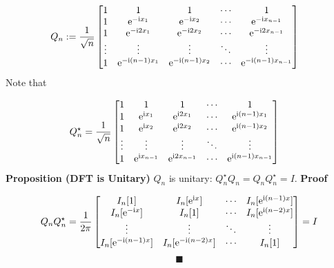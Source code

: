 \documentclass[12pt,landscape]{article}
\begin{document}
{\begin{align*}
Q_n &:= {1 \over \sqrt{n}} \begin{bmatrix} 1 & 1 & 1&  \ensuremath{\cdots} & 1 \\
                                    1 & {\rm e}^{-{\rm i} x_1} & {\rm e}^{-{\rm i} x_2} & \ensuremath{\cdots} & {\rm e}^{-{\rm i} x_{n-1}} \\
                                    1 & {\rm e}^{-{\rm i} 2 x_1} & {\rm e}^{-{\rm i} 2 x_2} & \ensuremath{\cdots} & {\rm e}^{-{\rm i} 2x_{n-1}} \\
                                    \ensuremath{\vdots} & \ensuremath{\vdots} & \ensuremath{\vdots} & \ensuremath{\ddots} & \ensuremath{\vdots} \\
                                    1 & {\rm e}^{-{\rm i} (n-1) x_1} & {\rm e}^{-{\rm i} (n-1) x_2} & \ensuremath{\cdots} & {\rm e}^{-{\rm i} (n-1) x_{n-1}}
\end{bmatrix} 
\end{align*}
Note that


\begin{align*}
Q_n^\ensuremath{\star} &= {1 \over \sqrt{n}} \begin{bmatrix}
1 & 1 & 1&  \ensuremath{\cdots} & 1 \\
1 & {\rm e}^{{\rm i} x_1} & {\rm e}^{{\rm i} 2 x_1} & \ensuremath{\cdots} & {\rm e}^{{\rm i} (n-1) x_1} \\
1 &  {\rm e}^{{\rm i} x_2}  & {\rm e}^{{\rm i} 2 x_2} & \ensuremath{\cdots} & {\rm e}^{{\rm i} (n-1)x_2} \\
\ensuremath{\vdots} & \ensuremath{\vdots} & \ensuremath{\vdots} & \ensuremath{\ddots} & \ensuremath{\vdots} \\
1 & {\rm e}^{{\rm i} x_{n-1}} & {\rm e}^{{\rm i} 2 x_{n-1}} & \ensuremath{\cdots} & {\rm e}^{{\rm i} (n-1) x_{n-1}}
\end{bmatrix} 
\end{align*}
\textbf{Proposition (DFT is Unitary)} $Q_n$ is unitary: $Q_n^\ensuremath{\star} Q_n = Q_n Q_n^\ensuremath{\star} = I$.
\newpage
\textbf{Proof}

\[
Q_n Q_n^\ensuremath{\star}  = \frac{1}{2\pi}\begin{bmatrix} I_n[1] & I_n[{\rm e}^{{\rm i} x}] & \ensuremath{\cdots} & I_n[{\rm e}^{{\rm i} (n-1) x}] \\
                            I_n[{\rm e}^{-{\rm i} x}] & I_n[1] & \ensuremath{\cdots} & I_n[{\rm e}^{{\rm i} (n-2) x}] \\
                            \ensuremath{\vdots} & \ensuremath{\vdots} & \ensuremath{\ddots} & \ensuremath{\vdots} \\
                            I_n[{\rm e}^{-{\rm i}(n-1) x}] & I_n[{\rm e}^{-{\rm i}(n-2) x}] & \ensuremath{\cdots} & I_n[1]
                            \end{bmatrix} = I
\]
\[
\blacksquare
\]
}
\end{document}

